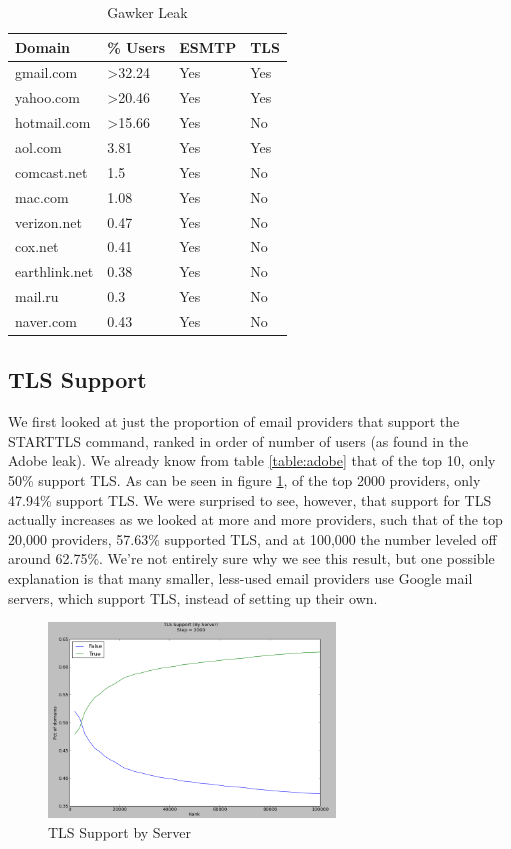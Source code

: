 \begin{table}
    \caption{Gawker Leak}
    \centering
    \label{table:gawker}
    \begin{tabular}{|l|l|l|l|}
        \hline
        Domain & \% Users & ESMTP & TLS \\
        \hline
            gmail.com & \textgreater32.24 & Yes & Yes \\
            yahoo.com & \textgreater20.46 & Yes & Yes \\
            hotmail.com & \textgreater15.66 & Yes & No \\
            aol.com & 3.81 & Yes & Yes \\
            comcast.net & 1.5 & Yes & No \\
            mac.com & 1.08 & Yes & No \\
            verizon.net & 0.47 & Yes & No \\
            cox.net & 0.41 & Yes & No \\
            earthlink.net & 0.38 & Yes & No \\
            mail.ru & 0.3 & Yes & No \\
            naver.com & 0.43 & Yes & No \\
        \hline
    \end{tabular}
\end{table}

\subsection{TLS Support}
We first looked at just the proportion of email providers that support the 
STARTTLS command, ranked in order of number of users (as found in the Adobe 
leak).  We already know from table \ref{table:adobe} that of the top 10, only 
50\% support TLS.  As can be seen in figure \ref{server_tls}, of the top 2000 providers, 
only 47.94\% support TLS.  We were surprised to see, however, that support for 
TLS actually increases as we looked at more and more providers, such that of the 
top 20,000 providers, 57.63\% supported TLS, and at 100,000 the number leveled 
off around 62.75\%.  We’re not entirely sure why we see this result, but one 
possible explanation is that many smaller, less-used email providers use Google 
mail servers, which support TLS, instead of setting up their own.

\begin{figure}
    \includegraphics[width=3.0in]{images/server_tls.png}
    \caption{TLS Support by Server}
    \label{server_tls}
\end{figure}

